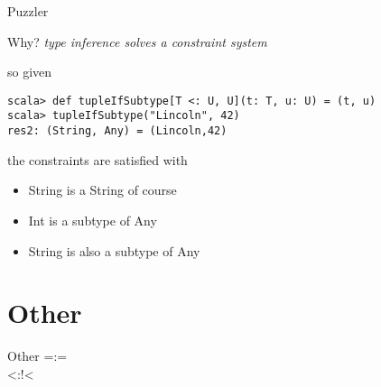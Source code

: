 \documentclass[11pt]{beamer}
\begin{document}
\begin{frame}[fragile] {Puzzler}
\begin{block}{Why?}
\textit{type inference solves a constraint system}
\end{block}\pause

\begin{block}{so given}
\begin{lstlisting} 
scala> def tupleIfSubtype[T <: U, U](t: T, u: U) = (t, u)
scala> tupleIfSubtype("Lincoln", 42)
res2: (String, Any) = (Lincoln,42)
\end{lstlisting} 
\end{block}

\begin{block}{the constraints are satisfied with}
\begin{itemize}
\item String is a String of course
\item Int is a subtype of Any
\item String is also a subtype of Any
\end{itemize}
\end{block}



\end{frame}

\section{Other} 
\begin{frame} {Other}
=:= \\
\textless:!\textless
\end{frame}
\end{document}
